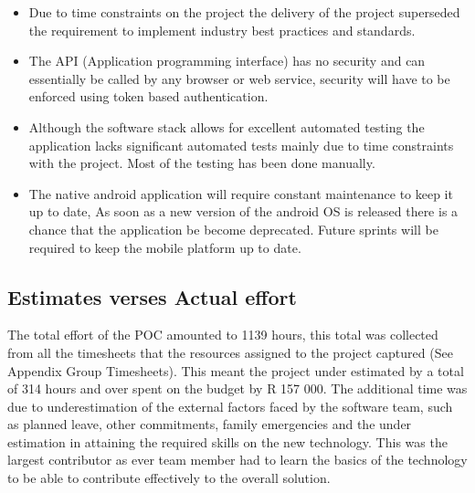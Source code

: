 \documentclass[12pt]{witseiepaper}
\begin{document}
\begin{itemize}
\item Due to time constraints on the project the delivery of the project superseded the requirement to implement industry best practices and standards.
\item The API (Application programming interface) has no security and can essentially be called by any browser or web service, security will have to be enforced using token based authentication.
\item Although the software stack allows for excellent automated testing the application lacks significant automated tests mainly due to time constraints with the project. Most of the testing has been done manually.
\item The native android application will require constant maintenance to keep it up to date, As soon as a new version of the android OS is released there is a chance that the application be become deprecated. Future sprints will be required to keep the mobile platform up to date. 
\end{itemize}



\subsection{Estimates verses Actual effort}
The total effort of the POC amounted to 1139 hours, this total was collected from all the timesheets that the resources assigned to the project captured (See Appendix Group Timesheets). This meant the project under estimated by a total of 314 hours and over spent on the budget by R 157 000.  The additional time was due to underestimation of the external factors faced by the software team, such as planned leave, other commitments, family emergencies and the under estimation in attaining the required skills on the new technology. This was the largest contributor as ever team member had to learn the basics of the technology to be able to contribute effectively to the overall solution.
\end{document}
